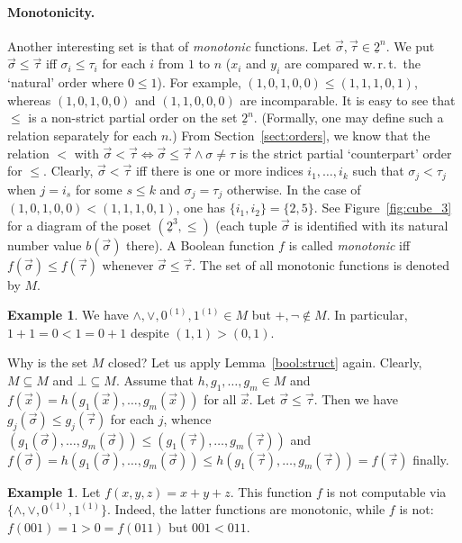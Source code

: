 \documentclass[12pt,notitlepage]{article}
\theoremstyle{plain}
\theoremstyle{definition}
\newtheorem{exm}[thm]{Example}
\theoremstyle{plain}
\newcommand{\sbs}{\subseteq}
\newcommand{\ul}[1]{\underline{#1}}
\newcommand{\1}{\mathbf{1}}
\newcommand{\0}{\mathbf{0}}
\begin{document}
\paragraph{Monotonicity.}
Another interesting set is that of \emph{monotonic} functions. Let $\vec \sigma, \vec \tau \in \ul{2}^n$. We put $\vec \sigma  \leq \vec \tau$ iff $\sigma_i \leq \tau_i$ for each $i$ from $1$ to $n$ ($x_i$ and $y_i$ are compared w.\,r.\,t.\ the `natural' order where $0 \leq 1$). For example, $(1,0,1,0,0) \leq (1,1,1,0,1)$, whereas $(1,0,1,0,0)$ and $(1,1,0,0,0)$ are incomparable. It is easy to see that ${\leq}$ is a non-strict partial order on the set $\ul{2}^n$. (Formally, one may define such a relation separately for each $n$.) From Section~\ref{sect:orders}, we know that the relation $<$ with $\vec \sigma < \vec \tau \iff \vec \sigma \leq \vec \tau \wedge \sigma \neq \tau$ is the strict partial `counterpart' order for ${\leq}$. Clearly, $\vec \sigma < \vec \tau$ iff there is one or more indices $i_1, \ldots, i_k$ such that $\sigma_j < \tau_j$ when $j = i_s$ for some $s \leq k$ and $\sigma_j = \tau_j$ otherwise. In the case of $(1,0,1,0,0) < (1,1,1,0,1)$, one has $\{i_1, i_2\} = \{2, 5\}$. See Figure~\ref{fig:cube_3} for a diagram of the poset $(\ul{2}^3, {\leq})$ (each tuple $\vec \sigma$ is identified with its natural number value $b(\vec\sigma)$ there). A Boolean function $f$ is called \emph{monotonic} iff $f(\vec \sigma) \leq f(\vec \tau)$ whenever $\vec \sigma \leq \vec \tau$. The set of all monotonic functions is denoted by $M$.

\begin{exm}
We have ${\wedge}, {\vee}, 0^{(1)}, 1^{(1)} \in M$ but ${+}, {\neg} \notin M$. In particular, $1 + 1 = 0 < 1 = 0 + 1$ despite $(1,1) > (0,1)$.
\end{exm}

Why is the set $M$ closed? Let us apply Lemma~\ref{bool:struct} again. Clearly, $M \sbs M$ and $\bot \sbs M$. Assume that $h, g_1, \ldots,g_m \in M$ and $f(\vec x) = h(g_1(\vec x),\ldots, g_m(\vec x))$ for all $\vec x$. Let $\vec \sigma \leq \vec \tau$. Then we have $g_j(\vec \sigma) \leq g_j(\vec \tau)$ for each $j$, whence $(g_1(\vec \sigma),\ldots, g_m(\vec \sigma)) \leq (g_1(\vec \tau),\ldots, g_m(\vec \tau))$ and $f(\vec \sigma) = h(g_1(\vec \sigma),\ldots, g_m(\vec \sigma)) \leq h(g_1(\vec \tau),\ldots, g_m(\vec \tau)) = f(\vec \tau)$ finally.

\begin{exm}
Let $f(x,y,z) = x + y + z$. This function $f$ is not computable via $\{{\wedge}, {\vee}, 0^{(1)}, 1^{(1)}\}$. Indeed, the latter functions are monotonic, while $f$ is not: $f(001) = 1 > 0 = f(011)$ but $001 < 011$.
\end{exm}
\end{document}
